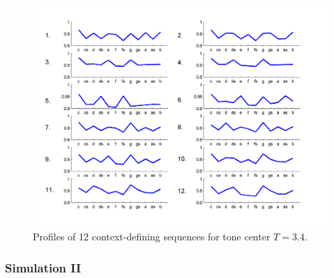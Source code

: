 \begin{figure}[p]
    \centering
    \includegraphics[width=\IPEMDefaultFigureWidth]{Graphics/TonalityDemoKK1Fig17}
    \caption{Profiles of 12 context-defining sequences for tone center $T=3.4.$}
    \label{Fig:TonalityDemoKK1Fig17}
\end{figure}

\subsubsection* {Simulation II}

